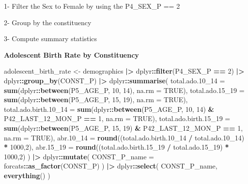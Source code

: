 \documentclass[
]{article}
\newenvironment{Shaded}{\begin{snugshade}}{\end{snugshade}}
\newcommand{\AttributeTok}[1]{\textcolor[rgb]{0.13,0.29,0.53}{#1}}
\newcommand{\ConstantTok}[1]{\textcolor[rgb]{0.56,0.35,0.01}{#1}}
\newcommand{\DecValTok}[1]{\textcolor[rgb]{0.00,0.00,0.81}{#1}}
\newcommand{\FloatTok}[1]{\textcolor[rgb]{0.00,0.00,0.81}{#1}}
\newcommand{\FunctionTok}[1]{\textcolor[rgb]{0.13,0.29,0.53}{\textbf{#1}}}
\newcommand{\NormalTok}[1]{#1}
\newcommand{\OtherTok}[1]{\textcolor[rgb]{0.56,0.35,0.01}{#1}}
\newcommand{\SpecialCharTok}[1]{\textcolor[rgb]{0.81,0.36,0.00}{\textbf{#1}}}
\newenvironment{UNFPAShadedBox}{%
\begin{tcolorbox}[sharp corners, enhanced, colback=white, boxrule=0pt, borderline west={2pt}{0pt}{orange}]%
}{\end{tcolorbox}}
\newenvironment{Highlighting}{\begin{UNFPAShadedBox}}{\end{UNFPAShadedBox}}
\begin{document}
1- Filter the Sex to Female by using the P4\_SEX\_P == 2

2- Group by the constituency

3- Compute summary statistics

\textbf{Adolescent Birth Rate by Constituency}

\begin{Shaded}
\begin{Highlighting}[]
\NormalTok{adolescent\_birth\_rate }\OtherTok{\textless{}{-}} 
\NormalTok{  demographics }\SpecialCharTok{|\textgreater{}}
\NormalTok{  dplyr}\SpecialCharTok{::}\FunctionTok{filter}\NormalTok{(P4\_SEX\_P }\SpecialCharTok{==} \DecValTok{2}\NormalTok{) }\SpecialCharTok{|\textgreater{}}
\NormalTok{  dplyr}\SpecialCharTok{::}\FunctionTok{group\_by}\NormalTok{(CONST\_P) }\SpecialCharTok{|\textgreater{}}
\NormalTok{  dplyr}\SpecialCharTok{::}\FunctionTok{summarise}\NormalTok{(}
    \AttributeTok{total.ado.10\_14 =} \FunctionTok{sum}\NormalTok{(dplyr}\SpecialCharTok{::}\FunctionTok{between}\NormalTok{(P5\_AGE\_P, }\DecValTok{10}\NormalTok{, }\DecValTok{14}\NormalTok{), }\AttributeTok{na.rm =} \ConstantTok{TRUE}\NormalTok{),}
    \AttributeTok{total.ado.15\_19 =} \FunctionTok{sum}\NormalTok{(dplyr}\SpecialCharTok{::}\FunctionTok{between}\NormalTok{(P5\_AGE\_P, }\DecValTok{15}\NormalTok{, }\DecValTok{19}\NormalTok{), }\AttributeTok{na.rm =} \ConstantTok{TRUE}\NormalTok{),}
    \AttributeTok{total.ado.birth.10\_14 =} \FunctionTok{sum}\NormalTok{(dplyr}\SpecialCharTok{::}\FunctionTok{between}\NormalTok{(P5\_AGE\_P, }\DecValTok{10}\NormalTok{, }\DecValTok{14}\NormalTok{) }\SpecialCharTok{\&}
\NormalTok{                                  P42\_LAST\_12\_MON\_P }\SpecialCharTok{==} \DecValTok{1}\NormalTok{, }\AttributeTok{na.rm =} \ConstantTok{TRUE}\NormalTok{),}
    \AttributeTok{total.ado.birth.15\_19 =} \FunctionTok{sum}\NormalTok{(dplyr}\SpecialCharTok{::}\FunctionTok{between}\NormalTok{(P5\_AGE\_P, }\DecValTok{15}\NormalTok{, }\DecValTok{19}\NormalTok{) }\SpecialCharTok{\&}
\NormalTok{                                  P42\_LAST\_12\_MON\_P }\SpecialCharTok{==} \DecValTok{1}\NormalTok{, }\AttributeTok{na.rm =} \ConstantTok{TRUE}\NormalTok{),}
    \AttributeTok{abr.10\_14 =} \FunctionTok{round}\NormalTok{((total.ado.birth}\FloatTok{.10}\NormalTok{\_14 }\SpecialCharTok{/}\NormalTok{ total.ado}\FloatTok{.10}\NormalTok{\_14) }\SpecialCharTok{*} \DecValTok{1000}\NormalTok{,}\DecValTok{2}\NormalTok{),}
    \AttributeTok{abr.15\_19 =} \FunctionTok{round}\NormalTok{((total.ado.birth}\FloatTok{.15}\NormalTok{\_19 }\SpecialCharTok{/}\NormalTok{ total.ado}\FloatTok{.15}\NormalTok{\_19) }\SpecialCharTok{*} \DecValTok{1000}\NormalTok{,}\DecValTok{2}\NormalTok{)}
\NormalTok{  ) }\SpecialCharTok{|\textgreater{}}
\NormalTok{  dplyr}\SpecialCharTok{::}\FunctionTok{mutate}\NormalTok{(}
    \AttributeTok{CONST\_P\_name =}\NormalTok{ forcats}\SpecialCharTok{::}\FunctionTok{as\_factor}\NormalTok{(CONST\_P)}
\NormalTok{  ) }\SpecialCharTok{|\textgreater{}}
\NormalTok{  dplyr}\SpecialCharTok{::}\FunctionTok{select}\NormalTok{(}
\NormalTok{    CONST\_P\_name,}
    \FunctionTok{everything}\NormalTok{()}
\NormalTok{  ) }


\end{Highlighting}
\end{Shaded}
\end{document}
